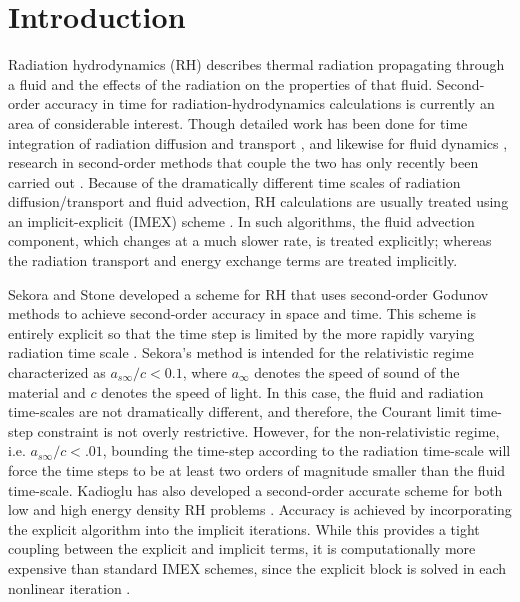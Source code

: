 \documentclass[preprint,12pt]{elsarticle}
\begin{document}
\section{Introduction}
\label{sec:Introduction}

Radiation hydrodynamics (RH) describes thermal radiation propagating through a fluid and the effects of the radiation on the properties of that fluid.  
Second-order accuracy in time for radiation-hydrodynamics calculations is currently an area of considerable interest.  Though detailed work has been 
done for time integration of radiation diffusion and transport \cite{mcclarren,lowrie2,knoll,olson,axelrod,stone,brown}, and likewise for fluid 
dynamics \cite{toro}, research in second-order methods that couple the two has only recently been carried out \cite{lowrie,bates,dai}.  Because of the 
dramatically different time scales of radiation diffusion/transport and fluid advection, RH calculations are usually treated using an implicit-explicit 
(IMEX) scheme \cite{lowrie, bates,dai}.  In such algorithms, the fluid advection component, which changes at a much slower rate, is treated explicitly; 
whereas the radiation transport and energy exchange terms are treated implicitly.  

Sekora and Stone developed a scheme for RH that uses second-order Godunov methods to achieve second-order accuracy in space and time.  This scheme is 
entirely explicit so that the time step is limited by the more rapidly varying radiation time scale \cite{sekora}.  Sekora's method is intended for the 
relativistic regime characterized as $a_{s\infty}/c < 0.1$, where $a_{\infty}$ denotes the speed of sound of the material and $c$ denotes the speed of light.  In this case, 
the fluid and radiation time-scales are not dramatically different, and therefore, the Courant limit time-step constraint is not overly restrictive.  
However, for the non-relativistic regime, i.e. $a_{s\infty}/c < .01$, bounding the time-step according to the radiation time-scale will force the time steps 
to be at least two orders of magnitude smaller than the fluid time-scale.  Kadioglu has also developed a second-order accurate scheme for both low and 
high energy density RH problems \cite{kadioglu,kadioglu2}.  Accuracy is achieved by incorporating the explicit algorithm into the implicit iterations. 
While this provides a tight coupling between the explicit and implicit terms, it is computationally more expensive than standard IMEX schemes, since the 
explicit block is solved in each nonlinear iteration \cite{kadioglu}.
\end{document}
